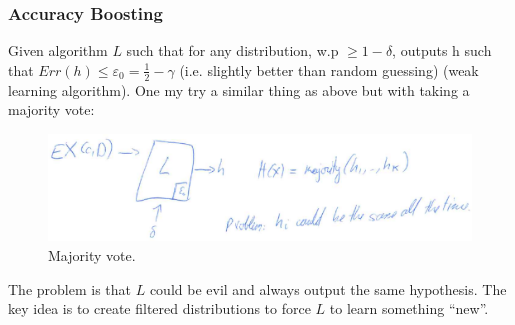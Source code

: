 \documentclass[12pt, letterpaper]{article}
\numberwithin{equation}{section} %
\newcommand{\ve}{\varepsilon}
\theoremstyle{definition}
\theoremstyle{remark}
\begin{document}
\subsubsection{Accuracy Boosting}
Given algorithm $L$ such that for any distribution, w.p $\geq 1-\delta$, outputs h such that $Err(h) \leq \ve_0 = \frac12 - \gamma$ (i.e. slightly better than random guessing) (weak learning algorithm). One my try a similar thing as above but with taking a majority vote:
\begin{figure}[H]
\centering
\includegraphics[width=0.6\linewidth]{../img/majority.png}
\caption{Majority vote.}
\end{figure}
The problem is that $L$ could be evil and always output the same hypothesis. The key idea is to create filtered distributions to force $L$ to learn something ``new''.
\end{document}

